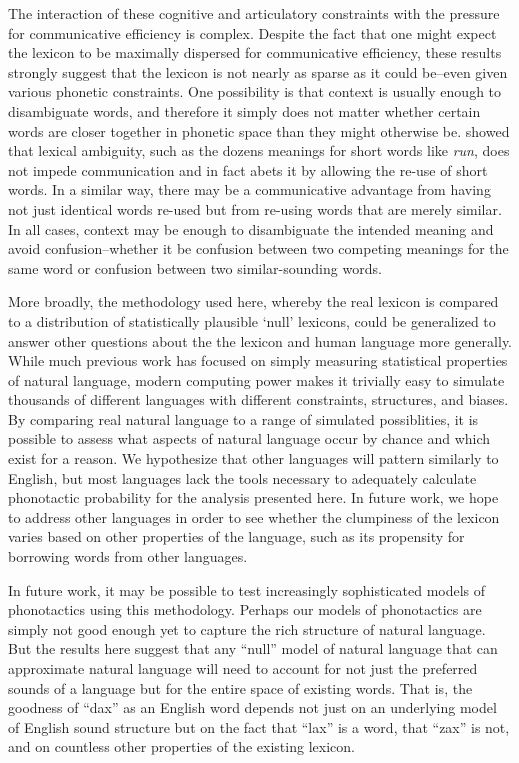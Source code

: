 \documentclass{article}
\begin{document}
The interaction of these cognitive and articulatory constraints with the pressure for communicative efficiency
is complex. Despite the fact that one might expect the lexicon to be maximally dispersed for communicative
efficiency, these results strongly suggest that the lexicon is not nearly as sparse as it could be--even given
various phonetic constraints. One possibility is that context is usually enough to disambiguate words, and
therefore it simply does not matter whether certain words are closer together in phonetic space than they
might otherwise be. \cite{piantadosi_communicative_2012} showed that lexical ambiguity, such as the dozens
meanings for short words like \textit{run}, does not impede communication and in fact abets it by allowing the
re-use of short words. In a similar way, there may be a communicative advantage from having not just identical
words re-used but from re-using words that are merely similar. In all cases, context may be enough to
disambiguate the intended meaning and avoid confusion--whether it be confusion between two competing meanings
for the same word or confusion between two similar-sounding words.


More broadly, the methodology used here, whereby the real lexicon is compared to a distribution of
statistically plausible `null' lexicons, could be generalized to answer other questions about the the lexicon
and human language more generally. While much previous work has focused on simply measuring statistical
properties of natural language, modern computing power makes it trivially easy to simulate thousands of
different languages with different constraints, structures, and biases. By comparing real natural language to
a range of simulated possiblities, it is possible to assess what aspects of natural language occur by chance
and which exist for a reason. We hypothesize that other languages will pattern similarly to English, but most
languages lack the tools necessary to adequately calculate phonotactic probability for the analysis presented
here. In future work, we hope to address other languages in order to see whether the clumpiness of the lexicon
varies based on other properties of the language, such as its propensity for borrowing words from other
languages.

In future work, it may be possible to test increasingly sophisticated models of phonotactics using this
methodology. Perhaps our models of phonotactics are simply not good enough yet to capture the rich structure
of natural language. But the results here suggest that any ``null'' model of natural language that can
approximate natural language will need to account for not just the preferred sounds of a language but for the
entire space of existing words. That is, the goodness of ``dax'' as an English word depends not just on an
underlying model of English sound structure but on the fact that ``lax'' is a word, that ``zax'' is not, and
on countless other properties of the existing lexicon.
\end{document}
